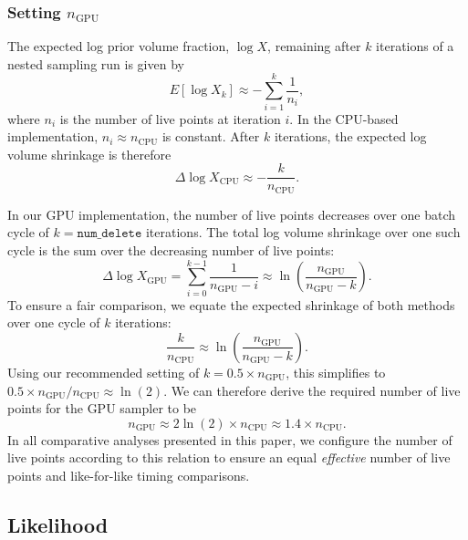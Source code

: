 \documentclass[fleqn,usenatbib]{mnras}
\begin{document}
\subsubsection{Setting $n_{\text{GPU}}$}
\label{sec:setting_n_gpu}

The expected log prior volume fraction, $\log X$, remaining after $k$ iterations
of a nested sampling run is given by~\citep{skilling}
\begin{equation}
    E[\log X_k] \approx -\sum_{i=1}^{k} \frac{1}{n_i},
\end{equation}
where $n_i$ is the number of live points at iteration $i$. In the
CPU-based implementation, $n_i \approx n_{\text{CPU}}$ is constant.
After $k$ iterations, the expected log volume shrinkage is therefore
\begin{equation}
    \Delta \log X_{\text{CPU}} \approx -\frac{k}{n_{\text{CPU}}}.
\end{equation}

In our GPU implementation, the number of live points decreases over one
batch cycle of $k = \texttt{num\_delete}$ iterations. The total log
volume shrinkage over one such cycle is the sum over the decreasing
number of live points:
\begin{equation}
   \Delta \log X_{\text{GPU}} = \sum_{i=0}^{k-1} \frac{1}{n_{\text{GPU}}-i} \approx \ln\left(\frac{n_{\text{GPU}}}{n_{\text{GPU}}-k}\right).
   \label{eq:gpu_compression}
\end{equation}
To ensure a fair comparison, we equate the expected shrinkage of both
methods over one cycle of $k$ iterations:
\begin{equation}
    \frac{k}{n_{\text{CPU}}} \approx \ln\left(\frac{n_{\text{GPU}}}{n_{\text{GPU}}-k}\right).
\end{equation}
Using our recommended setting of $k = 0.5 \times n_{\text{GPU}}$, this
simplifies to $0.5 \times n_{\text{GPU}} / n_{\text{CPU}} \approx \ln(2)$.
We can therefore derive the required number of live points for the GPU
sampler to be
\begin{equation}
    n_{\text{GPU}} \approx 2 \ln(2) \times n_{\text{CPU}} \approx 1.4 \times n_{\text{CPU}}.
\end{equation}
In all comparative analyses presented in this paper, we configure the
number of live points according to this relation to ensure an equal 
\textit{effective} number of live points and
like-for-like timing comparisons.

\subsection{Likelihood}
\end{document}
